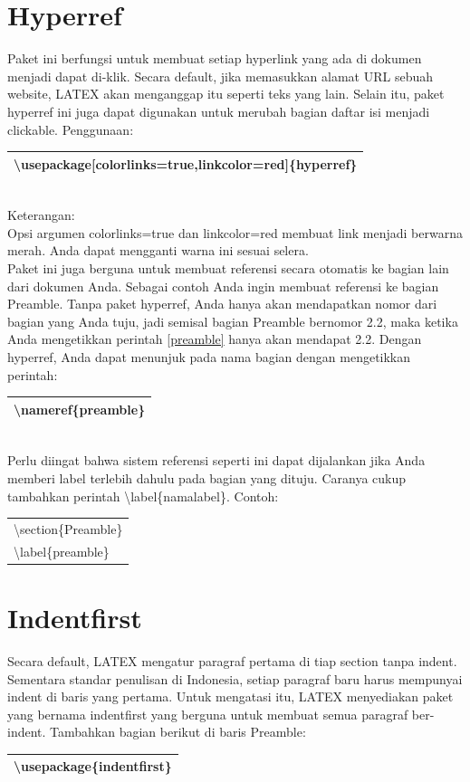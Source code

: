 \section{Hyperref}
Paket ini berfungsi untuk membuat setiap hyperlink yang ada di dokumen menjadi dapat di-klik. Secara default, jika memasukkan alamat URL sebuah website, LATEX akan menganggap itu seperti teks yang lain.
Selain itu, paket hyperref ini juga dapat digunakan untuk merubah bagian daftar isi menjadi clickable. Penggunaan:\\[0.5 cm]
\begin{tabular}{|p{13.5 cm}|}
\hline
\textbackslash usepackage[colorlinks=true,linkcolor=red]\{hyperref\}\\
\hline
\end{tabular}\\[0.5 cm]
Keterangan: \\
Opsi argumen colorlinks=true dan linkcolor=red membuat link menjadi berwarna merah. Anda dapat mengganti warna ini sesuai selera.\\[0.5 cm]
\noindent Paket ini juga berguna untuk membuat referensi secara otomatis ke bagian lain dari dokumen Anda. Sebagai contoh Anda ingin membuat referensi ke bagian Preamble. Tanpa paket hyperref, Anda hanya akan mendapatkan nomor dari bagian yang Anda tuju, jadi semisal bagian Preamble bernomor 2.2, maka ketika Anda mengetikkan perintah \ref{preamble} hanya akan mendapat 2.2. Dengan hyperref, Anda dapat menunjuk pada nama bagian dengan mengetikkan perintah:\\[0.5 cm]
\begin{tabular}{|p{13.5 cm}|}
\hline
\textbackslash nameref\{preamble\}\\
\hline
\end{tabular}\\[0.5 cm]
Perlu diingat bahwa sistem referensi seperti ini dapat dijalankan jika Anda memberi label terlebih dahulu pada bagian yang dituju. Caranya cukup tambahkan perintah \textbackslash label\{namalabel\}. Contoh:\\[0.5 cm]
\begin{tabular}{|p{13.5 cm}|}
\hline
\textbackslash section\{Preamble\}\\
\textbackslash  label\{preamble\}\\

\hline
\end{tabular}
\section{Indentfirst}
Secara default, LATEX mengatur paragraf pertama di tiap section tanpa indent. Sementara standar penulisan di Indonesia, setiap paragraf baru harus mempunyai indent di baris yang pertama. Untuk mengatasi itu, LATEX menyediakan paket yang bernama indentfirst yang berguna untuk membuat semua paragraf ber-indent. Tambahkan bagian berikut di baris Preamble: \\[0.5 cm]
\begin{tabular}{|p{13.5 cm}|}
\hline
\textbackslash usepackage\{indentfirst\}\\

\hline
\end{tabular}
